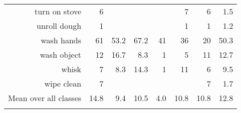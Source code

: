 \begin{tabular}{r r r@{\ \ }r@{\ \ }r@{\ \ }r@{\ \ }r r}
turn on stove & 6 &  &  &  & 7 & 6 & 1.5 \\
unroll dough & 1 &  &  &  & 1 & 1 & 1.2 \\
wash hands & 61 & 53.2 & 67.2 & 41 & 36 & 20 & 50.3 \\
wash object & 12 & 16.7 & 8.3 & 1 & 5 & 11 & 12.7 \\
whisk & 7 & 8.3 & 14.3 & 1 & 11 & 6 & 9.5 \\
wipe clean & 7 &  &  &  &  & 7 & 1.7 \\
\cmidrule(lr){1-1} \cmidrule(lr){2-2} \cmidrule(lr){3-7} \cmidrule(lr){8-8}
Mean over all classes&14.8&9.4&10.5&4.0&10.8&10.8&12.8
\\ \bottomrule \\ \end{tabular}
